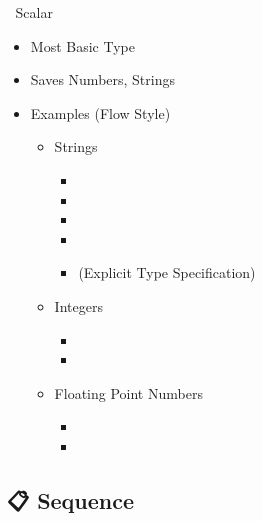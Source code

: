 \documentclass{beamer}
\begin{document}
\begin{frame}[fragile]{📏 Scalar}
  \begin{itemize}
    \item Most Basic Type
    \item Saves Numbers, Strings
    \item Examples (Flow Style)
    \begin{itemize}
      \item Strings
      \begin{itemize}
        \item {}
        \item {}
        \item {}
        \item {}
        \item {} (Explicit Type Specification)
      \end{itemize}
      \item Integers
      \begin{itemize}
        \item {}
        \item {}
      \end{itemize}
      \item Floating Point Numbers
      \begin{itemize}
        \item {}
        \item {}
      \end{itemize}
    \end{itemize}
  \end{itemize}
\end{frame}

\subsection{📋 Sequence}
\end{document}
